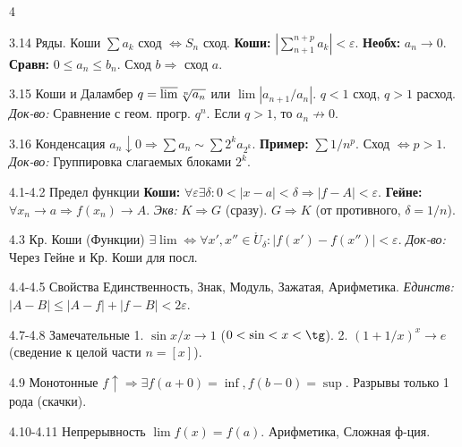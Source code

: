 \documentclass[8pt, a4paper, landscape]{extarticle}
\newcommand{\Ra}{\Rightarrow}
\newcommand{\eps}{\varepsilon}
\begin{document}
\begin{multicols*}{4}
\begin{ticket}{3.14 Ряды. Коши}
$\sum a_k$ сход $\iff S_n$ сход.
\textbf{Коши:} $|\sum_{n+1}^{n+p} a_k| < \eps$.
\textbf{Необх:} $a_n \to 0$.
\textbf{Сравн:} $0 \le a_n \le b_n$. Сход $b \Ra$ сход $a$.
\end{ticket}

\begin{ticket}{3.15 Коши и Даламбер}
$q = \varlimsup \sqrt[n]{a_n}$ или $\lim |a_{n+1}/a_n|$.
$q<1$ сход, $q>1$ расход.
\tcblower
\textit{Док-во:} Сравнение с геом. прогр. $q^n$.
Если $q>1$, то $a_n \not\to 0$.
\end{ticket}

\begin{ticket}{3.16 Конденсация}
$a_n \downarrow 0 \Ra \sum a_n \sim \sum 2^k a_{2^k}$.
\textbf{Пример:} $\sum 1/n^p$. Сход $\iff p>1$.
\tcblower
\textit{Док-во:} Группировка слагаемых блоками $2^k$.
\end{ticket}


\begin{ticket}{4.1-4.2 Предел функции}
\textbf{Коши:} $\forall \eps \exists \delta: 0<|x-a|<\delta \Ra |f-A|<\eps$.
\textbf{Гейне:} $\forall x_n \to a \Ra f(x_n) \to A$.
\tcblower
\textit{Экв:} $K \Ra G$ (сразу). $G \Ra K$ (от противного, $\delta=1/n$).
\end{ticket}

\begin{ticket}{4.3 Кр. Коши (Функции)}
$\exists \lim \iff \forall x', x'' \in \mathring{U}_\delta: |f(x')-f(x'')|<\eps$.
\tcblower
\textit{Док-во:} Через Гейне и Кр. Коши для посл.
\end{ticket}

\begin{ticket}{4.4-4.5 Свойства}
Единственность, Знак, Модуль, Зажатая, Арифметика.
\textit{Единств:} $|A-B| \le |A-f|+|f-B| < 2\eps$.
\end{ticket}

\begin{ticket}{4.7-4.8 Замечательные}
1. $\sin x/x \to 1$ ($0 < \sin < x < \tg$).
2. $(1+1/x)^x \to e$ (сведение к целой части $n=[x]$).
\end{ticket}

\begin{ticket}{4.9 Монотонные}
$f \uparrow \Ra \exists f(a+0)=\inf, f(b-0)=\sup$.
Разрывы только 1 рода (скачки).
\end{ticket}

\begin{ticket}{4.10-4.11 Непрерывность}
$\lim f(x) = f(a)$. Арифметика, Сложная ф-ция.
\end{ticket}


\end{multicols*}
\end{document}
